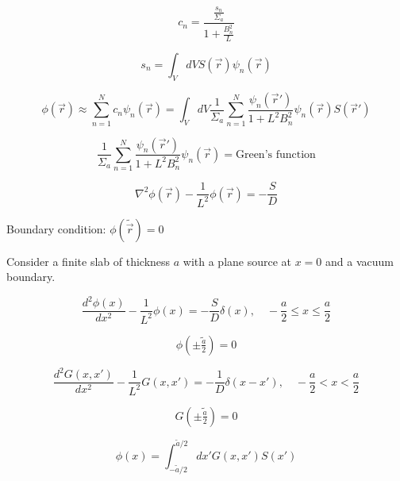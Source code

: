 \documentclass[12pt]{article}
\newcommand{\rvec}{\ensuremath{\vec{r}}}
\begin{document}
\begin{equation*}
c_n = \frac{\frac{s_n}{\Sigma_a}}{1+\frac{B_n^2}{L}}
\end{equation*}

\begin{equation*}
s_n = \int_V dV S(\rvec)\psi_n(\rvec)
\end{equation*}

\begin{equation*}
\phi(\rvec) \approx \sum_{n=1}^N c_n\psi_n(\rvec) = 
\int_V dV \frac{1}{\Sigma_a} \sum_{n=1}^N \frac{\psi_n(\rvec')}{1+L^2B_n^2}\psi_n(\rvec)S(\rvec')
\end{equation*}

\begin{equation*}
\frac{1}{\Sigma_a} \sum_{n=1}^N \frac{\psi_n(\rvec')}{1+L^2B_n^2}\psi_n(\rvec) = \text{Green's function}
\end{equation*}


\begin{equation*}
\nabla^2\phi(\rvec) - \frac{1}{L^2}\phi(\rvec) = -\frac{S}{D}
\end{equation*}

Boundary condition: $\phi(\tilde{\rvec}) = 0$


Consider a finite slab of thickness $a$ with a plane source at $x=0$ and a vacuum boundary.

\begin{equation*}
\frac{d^2\phi(x)}{dx^2} - \frac{1}{L^2}\phi(x) = -\frac{S}{D}\delta(x),\quad
-\frac{a}{2} \leq x \leq \frac{a}{2}
\end{equation*}

\begin{equation*}
\phi\left(\pm\tilde{\tfrac{a}{2}}\right) = 0
\end{equation*}

\begin{equation*}
\frac{d^2G(x,x')}{dx^2} - \frac{1}{L^2}G(x,x') = -\frac{1}{D}\delta(x-x'),\quad
-\frac{a}{2} < x < \frac{a}{2}
\end{equation*}

\begin{equation*}
G\left(\pm\tilde{\tfrac{a}{2}}\right) = 0
\end{equation*}

\begin{equation*}
\phi(x) = \int_{-\tilde{a}/2}^{\tilde{a}/2}dx'G(x,x')S(x')
\end{equation*}
\end{document}
